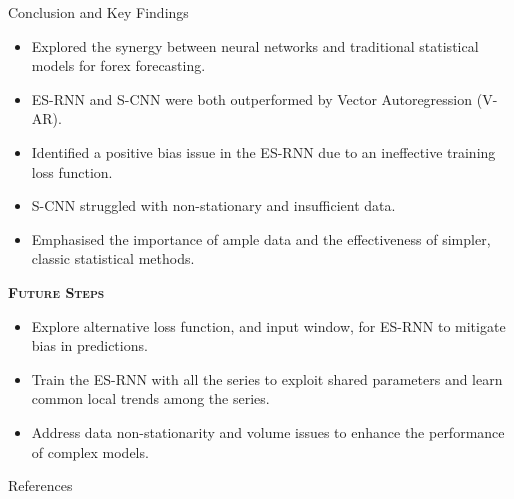 \documentclass[aspectratio=169, 12pt]{beamer}
\begin{document}
\begin{frame}[allowframebreaks]{Conclusion and Key Findings}
        \begin{itemize}
            \item Explored the synergy between neural networks and traditional statistical models for forex forecasting.
            \item ES-RNN and S-CNN were both outperformed by Vector Autoregression (V-AR).
            \item Identified a positive bias issue in the ES-RNN due to an ineffective training loss function.
            \item S-CNN struggled with non-stationary and insufficient data.
            \item Emphasised the importance of ample data and the effectiveness of simpler, classic statistical methods.
        \end{itemize}
    \newpage
    \begin{center}
        \textsc{\textbf{Future Steps}}
    \end{center}
        \begin{itemize}
            \item Explore alternative loss function, and input window, for ES-RNN to mitigate bias in predictions.
            \item Train the ES-RNN with all the series to exploit shared parameters and learn common local trends among the series.
            \item Address data non-stationarity and volume issues to enhance the performance of complex models.
        \end{itemize}
\end{frame}

\begin{frame}[allowframebreaks]{References}

  
  

\end{frame}
\end{document}
